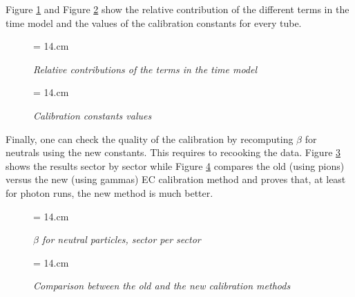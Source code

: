 \documentclass [12pt,letterpaper]{article}
\begin{document}
Figure \ref{fig:timemodelterms} and Figure \ref{fig:parameters} show the relative contribution of the different terms in the time model and the values of the calibration constants for every tube. 

\begin{figure} [h]
\begin{center}
\epsfxsize = 14.cm
\caption {\it Relative contributions of the terms in the time model}
\label{fig:timemodelterms}
\end{center}
\end{figure}


\begin{figure} [h]
\begin{center}
\epsfxsize = 14.cm
\caption {\it Calibration constants values }
\label{fig:parameters}
\end{center}
\end{figure}

Finally, one can check the  quality of the calibration by recomputing $\beta$ for neutrals using the new constants. This requires to recooking the data. Figure \ref{fig:betapersector} shows the results sector by sector while Figure \ref{fig:oldvsnewcalib} compares the old (using pions) versus the new (using gammas) EC calibration method and proves that, at least for photon runs, the new method is much better.  

\begin{figure} [h]
\begin{center}
\epsfxsize = 14.cm
\caption {\it $\beta$ for neutral particles, sector per sector}
\label{fig:betapersector}
\end{center}
\end{figure}


\begin{figure} [h]
\begin{center}
\epsfxsize = 14.cm
\caption {\it Comparison between the old and the new calibration methods}
\label{fig:oldvsnewcalib}
\end{center}
\end{figure}
\end{document}
